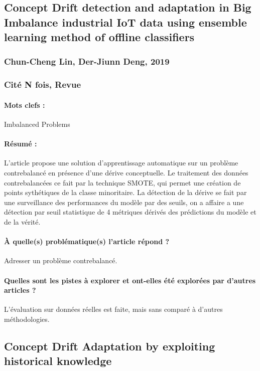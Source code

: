 \documentclass[11pt,a4paper]{report}
\begin{document}
\subsection{Concept Drift detection and adaptation in Big Imbalance industrial IoT data using ensemble learning method of offline classifiers}
\subsubsection{Chun-Cheng Lin, Der-Jiunn Deng, 2019}

\subsubsection{Cité N fois, Revue}

\paragraph{Mots clefs :} Imbalanced Problems

\paragraph{Résumé :} L'article propose une solution d'apprentissage automatique sur un problème contrebalancé en présence d'une dérive conceptuelle. Le traitement des données contrebalancées ce fait par la technique SMOTE, qui permet une création de points sythétiques de la classe minoritaire. La détection de la dérive se fait par une surveillance des performances du modèle par des seuils, on a affaire a une détection par seuil statistique de 4 métriques dérivés des prédictions du modèle et de la vérité.

\paragraph{À quelle(s) problématique(s) l'article répond ?} Adresser un problème contrebalancé.

\paragraph{Quelles sont les pistes à explorer et ont-elles  été explorées par d'autres articles ?} L'évaluation sur données réelles est faite, mais sans comparé à d'autres méthodologies.






\subsection{Concept Drift Adaptation by exploiting historical knowledge}
\end{document}
